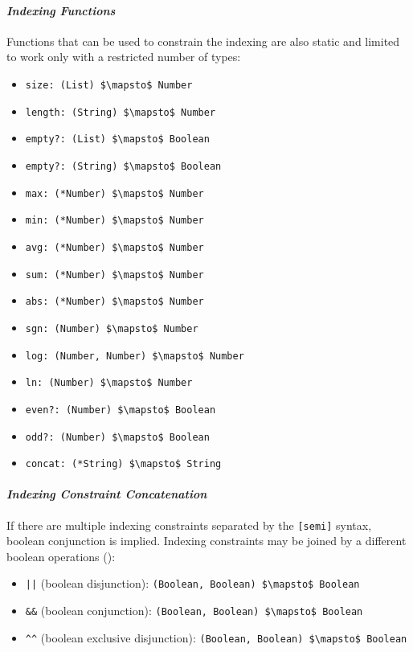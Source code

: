 \paragraph{\em Indexing Functions}
Functions that can be used to constrain the indexing are also static and limited to work only with a restricted number of types:
\begin{itemize}
\item \lstinline!size: (List) $\mapsto$ Number!
\item \lstinline!length: (String) $\mapsto$ Number!
\item \lstinline!empty?: (List) $\mapsto$ Boolean!
\item \lstinline!empty?: (String) $\mapsto$ Boolean!
\item \lstinline!max: (*Number) $\mapsto$ Number!
\item \lstinline!min: (*Number) $\mapsto$ Number!
\item \lstinline!avg: (*Number) $\mapsto$ Number!
\item \lstinline!sum: (*Number) $\mapsto$ Number!
\item \lstinline!abs: (*Number) $\mapsto$ Number!
\item \lstinline!sgn: (Number) $\mapsto$ Number!
\item \lstinline!log: (Number, Number) $\mapsto$ Number!
\item \lstinline!ln: (Number) $\mapsto$ Number!
\item \lstinline!even?: (Number) $\mapsto$ Boolean!
\item \lstinline!odd?: (Number) $\mapsto$ Boolean!
\item \lstinline!concat: (*String) $\mapsto$ String!
\end{itemize}

\paragraph{\em Indexing Constraint Concatenation}
If there are multiple indexing constraints separated by the \lstinline![semi]! syntax, boolean conjunction is implied. Indexing constraints may be joined by a different boolean operations (): 
\begin{itemize}
\item \lstinline!||! (boolean disjunction): \lstinline!(Boolean, Boolean) $\mapsto$ Boolean!
\item \lstinline!&&! (boolean conjunction): \lstinline!(Boolean, Boolean) $\mapsto$ Boolean!
\item \lstinline!^^! (boolean exclusive disjunction): \lstinline!(Boolean, Boolean) $\mapsto$ Boolean!
\end{itemize}

